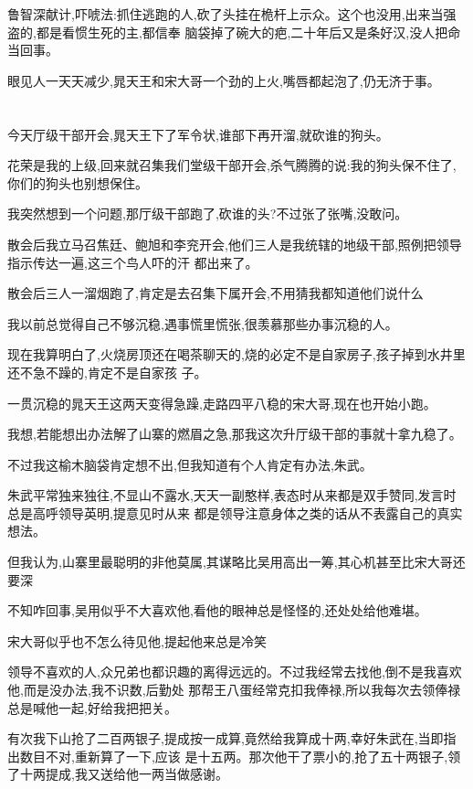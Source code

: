﻿\documentclass[12pt]{article}
\begin{document}
鲁智深献计,吓唬法:抓住逃跑的人,砍了头挂在桅杆上示众。这个也没用,出来当强盗的,都是看惯生死的主,都信奉
脑袋掉了碗大的疤,二十年后又是条好汉,没人把命当回事。

眼见人一天天减少,晁天王和宋大哥一个劲的上火,嘴唇都起泡了,仍无济于事。

\section{}

今天厅级干部开会,晁天王下了军令状,谁部下再开溜,就砍谁的狗头。

花荣是我的上级,回来就召集我们堂级干部开会,杀气腾腾的说:我的狗头保不住了,你们的狗头也别想保住。

我突然想到一个问题,那厅级干部跑了,砍谁的头?不过张了张嘴,没敢问。

散会后我立马召焦廷、鲍旭和李兖开会,他们三人是我统辖的地级干部,照例把领导指示传达一遍,这三个鸟人吓的汗
都出来了。

散会后三人一溜烟跑了,肯定是去召集下属开会,不用猜我都知道他们说什么\dldots

我以前总觉得自己不够沉稳,遇事慌里慌张,很羡慕那些办事沉稳的人。

现在我算明白了,火烧房顶还在喝茶聊天的,烧的必定不是自家房子,孩子掉到水井里还不急不躁的,肯定不是自家孩
子。

一贯沉稳的晁天王这两天变得急躁,走路四平八稳的宋大哥,现在也开始小跑。

我想,若能想出办法解了山寨的燃眉之急,那我这次升厅级干部的事就十拿九稳了。

不过我这榆木脑袋肯定想不出,但我知道有个人肯定有办法,朱武。

朱武平常独来独往,不显山不露水,天天一副憨样,表态时从来都是双手赞同,发言时总是高呼领导英明,提意见时从来
都是领导注意身体之类的话\dldots 从不表露自己的真实想法。

但我认为,山寨里最聪明的非他莫属,其谋略比吴用高出一筹,其心机甚至比宋大哥还要深\dldots

不知咋回事,吴用似乎不大喜欢他,看他的眼神总是怪怪的,还处处给他难堪。

宋大哥似乎也不怎么待见他,提起他来总是冷笑\dldots

领导不喜欢的人,众兄弟也都识趣的离得远远的。不过我经常去找他,倒不是我喜欢他,而是没办法,我不识数,后勤处
那帮王八蛋经常克扣我俸禄,所以我每次去领俸禄总是喊他一起,好给我把把关。

有次我下山抢了二百两银子,提成按一成算,竟然给我算成十两,幸好朱武在,当即指出数目不对,重新算了一下,应该
是十五两。那次他干了票小的,抢了五十两银子,领了十两提成,我又送给他一两当做感谢。
\end{document}
